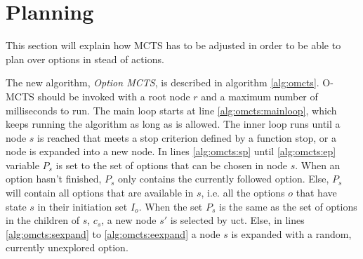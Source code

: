 \section{Planning}
\label{sec:planning}
This section will explain how MCTS has to be adjusted in order to be able to
plan over options in stead of actions.

The new algorithm, \emph{Option MCTS}, is described in algorithm
\ref{alg:omcts}. O-MCTS should be invoked with a root node $r$ and a maximum
number of milliseconds to run. The main loop starts at line
\ref{alg:omcts:mainloop}, which keeps running the algorithm as long as is
allowed. The inner loop runs until a node $s$ is reached that meets a stop
criterion defined by a function \textsf{stop}, or a node is expanded into a new
node. In lines \ref{alg:omcts:sp} until \ref{alg:omcts:ep} variable $P_s$ is set
to the set of options that can be chosen in node $s$. When an option hasn't
finished, $P_s$ only contains the currently followed option. Else, $P_s$ will
contain all options that are available in $s$, i.e. all the options $o$ that
have state $s$ in their initiation set $I_o$. When the set $P_s$ is the same as
the set of options in the children of $s$, $c_s$, a new node $s'$ is selected by
\textsf{uct}. Else, in lines \ref{alg:omcts:sexpand} to \ref{alg:omcts:eexpand}
a node $s$ is expanded with a random, currently unexplored option.


